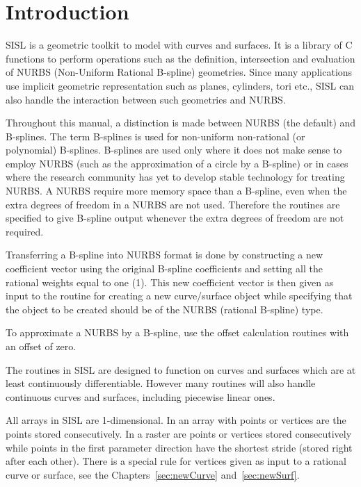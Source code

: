 \chapter{Introduction}
\label{introduction}
SISL is a geometric toolkit to model with curves and surfaces. It is a
library of C functions to perform operations such as the definition,
intersection and evaluation of NURBS (Non-Uniform Rational B-spline)
geometries. Since many applications use implicit geometric
representation such as planes, cylinders, tori etc., SISL can also
handle the interaction between such geometries and NURBS.

\medskip
Throughout this manual, a distinction is made between NURBS (the
default) and B-splines. The term B-splines is used for non-uniform
non-rational (or polynomial) B-splines. B-splines are used only where it
does not make sense to employ NURBS (such as the approximation of a
circle by a B-spline) or in cases where the research
community has yet to develop stable technology for treating NURBS.
A NURBS require more memory space than a B-spline, even when the
extra degrees of freedom in a NURBS are not used. Therefore the routines
are specified to give B-spline output whenever the extra degrees of
freedom are not required.

Transferring a B-spline into NURBS format is done by constructing a new
coefficient vector using the original B-spline coefficients and setting
all the rational weights equal to one (1).
This new coefficient vector is then given as input to the routine for
creating a new curve/surface object while specifying that the object to
be created should be of the NURBS (rational B-spline) type.

To approximate a NURBS by a B-spline, use the offset calculation
routines with an offset of zero.

The routines in SISL are designed to function on curves and surfaces
which are at least continuously differentiable. However many routines
will also handle continuous curves and surfaces, including piecewise
linear ones.

\medskip
All arrays in SISL are 1-dimensional. In an array with points or vertices
are the points stored consecutively. In a raster are points or vertices
stored consecutively while points in the first parameter direction have
the shortest stride (stored right after each other). There is a special
rule for vertices given as input to a rational curve or surface, see the
Chapters~\ref{sec:newCurve} and~\ref{sec:newSurf}.

